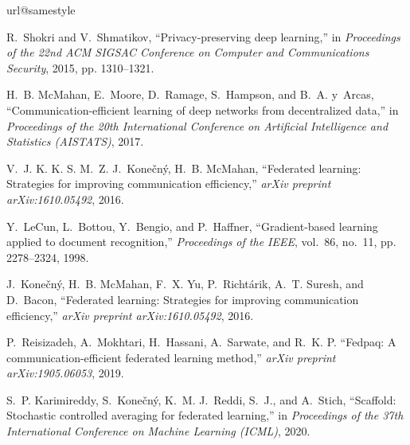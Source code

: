 \documentclass[conference]{IEEEtran}
\begin{document}
\begin{thebibliography}{1}
\providecommand{\url}[1]{#1}
\csname url@samestyle\endcsname
\providecommand{\newblock}{\relax}
\providecommand{\bibinfo}[2]{#2}
\providecommand{\BIBentrySTDinterwordspacing}{\spaceskip=0pt\relax}
\providecommand{\BIBentryALTinterwordstretchfactor}{4}
\providecommand{\BIBentryALTinterwordspacing}{\spaceskip=\fontdimen2\font plus
\BIBentryALTinterwordstretchfactor\fontdimen3\font minus
  \fontdimen4\font\relax}
\providecommand{\BIBforeignlanguage}[2]{{%
\expandafter\ifx\csname l@#1\endcsname\relax
\typeout{** WARNING: IEEEtran.bst: No hyphenation pattern has been}%
\typeout{** loaded for the language `#1'. Using the default patterns.}%
\fi
\language=\csname l@#1\endcsname
\boldgroup
\emph{#2}%
\egroup
}}
\providecommand{\BIBdecl}{\relax}
\BIBdecl

R.~Shokri and V.~Shmatikov, ``Privacy-preserving deep learning,'' in
  \emph{Proceedings of the 22nd ACM SIGSAC Conference on Computer and
  Communications Security}, 2015, pp. 1310--1321.

H.~B. McMahan, E.~Moore, D.~Ramage, S.~Hampson, and B.~A. y~Arcas,
  ``Communication-efficient learning of deep networks from decentralized data,''
  in \emph{Proceedings of the 20th International Conference on Artificial
  Intelligence and Statistics (AISTATS)}, 2017.

V.~J. K. K. S. M.~Z. J.~Konečný, H.~B. McMahan, ``Federated learning: Strategies
  for improving communication efficiency,'' \emph{arXiv preprint
  arXiv:1610.05492}, 2016.

Y.~LeCun, L.~Bottou, Y.~Bengio, and P.~Haffner, ``Gradient-based learning
  applied to document recognition,'' \emph{Proceedings of the IEEE}, vol.~86,
  no.~11, pp. 2278--2324, 1998.

J.~Konečný, H.~B. McMahan, F.~X. Yu, P.~Richtárik, A.~T. Suresh, and D.~Bacon,
  ``Federated learning: Strategies for improving communication efficiency,''
  \emph{arXiv preprint arXiv:1610.05492}, 2016.

P.~Reisizadeh, A.~Mokhtari, H.~Hassani, A.~Sarwate, and R.~K. P.
  ``Fedpaq: A communication-efficient federated learning method,'' \emph{arXiv
  preprint arXiv:1905.06053}, 2019.

S.~P. Karimireddy, S.~Konečný, K.~M. J.~Reddi, S.~J., and A.~Stich, ``Scaffold:
  Stochastic controlled averaging for federated learning,'' in \emph{Proceedings
  of the 37th International Conference on Machine Learning (ICML)}, 2020.


\end{thebibliography}
\end{document}
